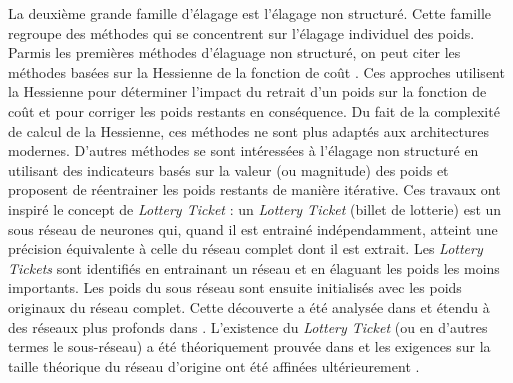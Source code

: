 La deuxième grande famille d'élagage est l'élagage non structuré. Cette famille
regroupe des méthodes qui se concentrent sur l'élagage individuel des poids.
Parmis les premières méthodes d'élaguage non structuré, on peut citer les
méthodes basées sur la Hessienne de la fonction de coût
\cite{DBLP:conf/nips/CunDS89,DBLP:conf/icnn/HassibiSW93}. Ces approches
utilisent la Hessienne pour déterminer l'impact du retrait d'un poids sur la
fonction de coût et pour corriger les poids restants en conséquence. Du fait de
la complexité de calcul de la Hessienne, ces méthodes ne sont plus adaptés aux
architectures modernes. D'autres méthodes se sont intéressées à l'élagage non
structuré en utilisant des indicateurs basés sur la valeur (ou magnitude) des
poids \cite{DBLP:conf/nips/HanPTD15} et proposent de réentrainer les poids
restants de manière itérative. Ces travaux ont inspiré le concept de
\emph{Lottery Ticket} \cite{DBLP:journals/corr/abs-1903-01611}: un \emph{Lottery
  Ticket} (billet de lotterie) est un sous réseau de neurones qui, quand il est
entrainé indépendamment, atteint une précision équivalente à celle du réseau
complet dont il est extrait. Les \emph{Lottery Tickets} sont identifiés en
entrainant un réseau et en élaguant les poids les moins importants. Les poids du
sous réseau sont ensuite initialisés avec les poids originaux du réseau complet.
Cette découverte a été analysée dans \cite{DBLP:conf/nips/ZhouLLY19} et étendu à
des réseaux plus profonds dans \cite{DBLP:journals/corr/abs-1903-01611}.
L'existence du \emph{Lottery Ticket} (ou en d'autres termes le sous-réseau) a
été théoriquement prouvée dans \cite{DBLP:conf/icml/MalachYSS20} et les
exigences sur la taille théorique du réseau d'origine ont été affinées
ultérieurement \cite{DBLP:conf/nips/PensiaRNVP20,DBLP:conf/nips/OrseauHR20}.


